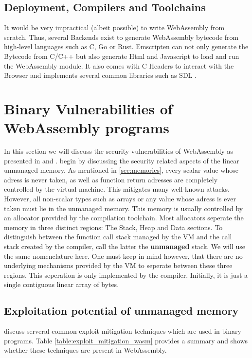 \documentclass[sigconf]{acmart}
\begin{document}
\subsection{Deployment, Compilers and Toolchains}
It would be very impractical (albeit possible) to write WebAssembly from scratch. Thus, several Backends exist to generate WebAssembly bytecode from high-level languages such as C, Go or Rust. Emscripten \cite{emscripten} can not only generate the Bytecode from C/C++ but also generate Html and Javascript to load and run the WebAssembly module. It also comes with C Headers to interact with the Browser and implements several common libraries such as SDL \cite{sdl2}.  

\section{Binary Vulnerabilities of WebAssembly programs}
\label{sec:binary_vulns}
In this section we will discuss the security vulnerabilities of WebAssembly as presented in \cite{mcfadden_security_2018} and \cite{lehmann_everything_2020}. \cite{lehmann_everything_2020} begin by discussing the security related aspects of the linear unmanaged memory. As mentioned in \ref{sec:memories}, every scalar value whose adress is never taken, as well as function return adresses are completely controlled by the virtual machine. This mitigates many well-known attacks. However, all non-scalar types such as arrays or any value whose adress is ever taken must lie in the unmanaged memory. This memory is usually controlled by an allocator provided by the compilation toolchain. Most allocators seperate the memory in three distinct regions: The Stack, Heap and Data sections. To distinguish between the function call stack managed by the VM and the call stack created by the compiler, \cite{lehmann_everything_2020} call the latter the \textbf{unmanaged} stack. We will use the same nomenclature here. One must keep in mind however, that there are no underlying mechanisms provided by the VM to seperate between these three regions. This seperation is only implemented by the compiler. Initially, it is just a single contiguous linear array of bytes. 

\subsection{Exploitation potential of unmanaged memory}
\cite{mcfadden_security_2018} discuss serveral common exploit mitigation techniques which are used in binary programs. Table \ref{table:exploit_mitigation_wasm} provides a summary and shows whether these techniques are present in WebAssembly.
\end{document}

